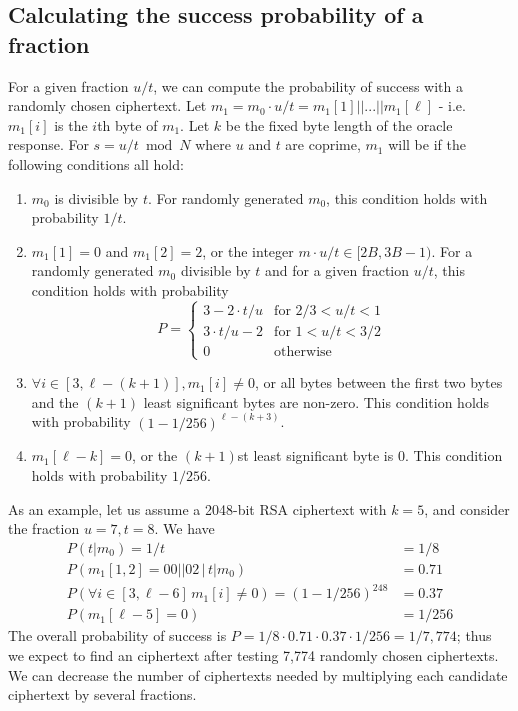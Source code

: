 \label{sec:adapted-bb}

\subsection{Calculating the success probability of a fraction}
\label{sec:fraction-probability}

For a given fraction $u/t$, we can compute the probability of success with a randomly chosen \tlsconform ciphertext.  Let $m_1 = m_0 \cdot u/t = m_1[1]||...||m_1[\ell]$ - i.e. $m_1[i]$ is the $i$th byte of $m_1$.  Let $k$ be the fixed byte length of the oracle response.  For $s = u/t \bmod N$ where $u$ and $t$ are coprime, $m_1$ will be \sslconform if the following conditions all hold:
\begin{enumerate}
	\item $m_0$ is divisible by $t$. For randomly generated $m_0$, this condition holds with probability $1/t$.  
		\item $m_1[1] = 0$ and $m_1[2] = 2$, or the integer $m \cdot u/t \in [2B, 3B-1)$.
		For a randomly generated $m_0$ divisible by $t$ and for a given fraction $u/t$, this condition holds with probability
\begin{equation*}
P = 
\begin{cases}
3 - 2 \cdot t/u & \text{for }   2/3 < u/t < 1 \\
3 \cdot t/u - 2 & \text{for }   1 < u/t < 3/2 \\
0 & \text{otherwise}
\end{cases}
\label{eq:oracle}
\end{equation*} 
\item $\forall i \in [3, \ell-(k+1)], m_1[i] \neq 0$, or all bytes between the first two bytes and the $(k+1)$ least significant bytes are non-zero.  This condition holds with probability $(1 - 1/256)^{\ell-(k+3)}$.
\item $m_1[\ell-k] = 0$, or the $(k+1)$st least significant byte is 0.  This condition holds with probability $1/256$.
\end{enumerate}
As an example, let us assume a 2048-bit RSA ciphertext with $k = 5$, and consider the fraction $u = 7, t = 8$.  We have
\begin{align*}
P(t|m_0)= 1/t &= 1/8 \\
P( m_1[1,2] = 00||02 \, \big\vert \, t|m_0) &= 0.71\\
P(\forall i \in [3, \ell-6] \, m_1[i] \neq 0) = (1 - 1/256)^{248} &= 0.37\\
P(m_1[\ell-5] = 0) &= 1/256
\end{align*}
The overall probability of success is $P = 1/8 \cdot 0.71 \cdot 0.37 \cdot 1/256 = 1 / 7,774$; thus we expect to find an \sslconform ciphertext after testing 7,774 randomly chosen \tlsconform ciphertexts.  We can decrease the number of \tlsconform ciphertexts needed by multiplying each candidate ciphertext by several fractions.

